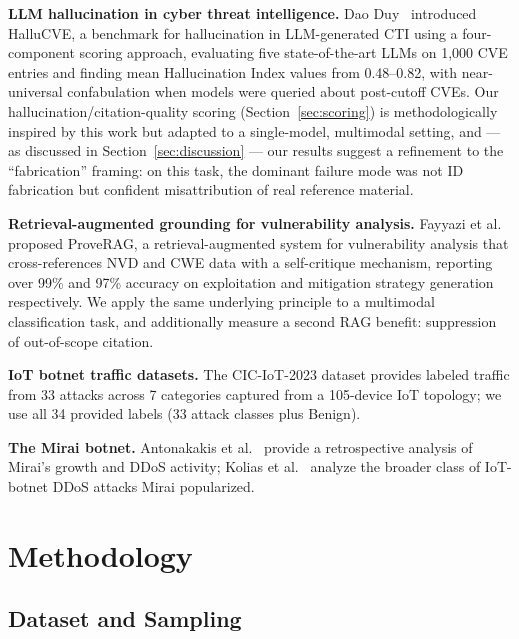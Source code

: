 \documentclass[10pt,twocolumn]{article}
\begin{document}
\textbf{LLM hallucination in cyber threat intelligence.} Dao Duy~\cite{hallucve} introduced HalluCVE, a benchmark for hallucination in LLM-generated CTI using a four-component scoring approach, evaluating five state-of-the-art LLMs on 1{,}000 CVE entries and finding mean Hallucination Index values from 0.48--0.82, with near-universal confabulation when models were queried about post-cutoff CVEs. Our hallucination/citation-quality scoring (Section~\ref{sec:scoring}) is methodologically inspired by this work but adapted to a single-model, multimodal setting, and --- as discussed in Section~\ref{sec:discussion} --- our results suggest a refinement to the ``fabrication'' framing: on this task, the dominant failure mode was not ID fabrication but confident misattribution of real reference material.

\textbf{Retrieval-augmented grounding for vulnerability analysis.} Fayyazi et al.~\cite{proverag} proposed ProveRAG, a retrieval-augmented system for vulnerability analysis that cross-references NVD and CWE data with a self-critique mechanism, reporting over 99\% and 97\% accuracy on exploitation and mitigation strategy generation respectively. We apply the same underlying principle to a multimodal classification task, and additionally measure a second RAG benefit: suppression of out-of-scope citation.

\textbf{IoT botnet traffic datasets.} The CIC-IoT-2023 dataset \cite{neto2023ciciot2023} provides labeled traffic from 33 attacks across 7 categories captured from a 105-device IoT topology; we use all 34 provided labels (33 attack classes plus Benign).

\textbf{The Mirai botnet.} Antonakakis et al.~\cite{antonakakis2017understanding} provide a retrospective analysis of Mirai's growth and DDoS activity; Kolias et al.~\cite{kolias2017ddos} analyze the broader class of IoT-botnet DDoS attacks Mirai popularized.

\section{Methodology}

\subsection{Dataset and Sampling}
\end{document}
